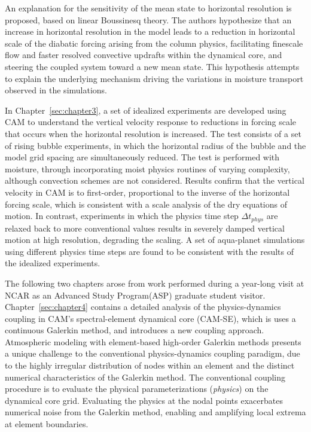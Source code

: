 An explanation for the sensitivity of the mean state to horizontal resolution is proposed, based on linear Boussinesq theory. The authors hypothesize that an increase in horizontal resolution in the model leads to a reduction in horizontal scale of the diabatic forcing arising from the column physics, facilitating finescale flow and faster resolved convective updrafts within the dynamical core, and steering the coupled system toward a new mean state. This hypothesis attempts to explain the underlying mechanism driving the variations in moisture transport observed in the simulations.

In Chapter~\ref{sec:chapter3}, a set of idealized experiments are developed using CAM to understand the vertical velocity response to reductions in forcing scale that occurs when the horizontal resolution is increased. The test consists of a set of rising bubble experiments, in which the horizontal radius of the bubble and the model grid spacing are simultaneously reduced. The test is performed with moisture, through incorporating moist physics routines of varying complexity, although convection schemes are not considered. Results confirm that the vertical velocity in CAM is to first-order, proportional to the inverse of the horizontal forcing scale, which is consistent with a scale analysis of the dry equations of motion. In contrast, experiments in which the physics time step $\Delta t_{phys}$ are relaxed back to more conventional values results in severely damped vertical motion at high resolution, degrading the scaling. A set of aqua-planet simulations using different physics time steps are found to be consistent with the results of the idealized experiments.

The following two chapters arose from work performed during a year-long visit at NCAR as an Advanced Study Program(ASP) graduate student visitor. Chapter~\ref{sec:chapter4} contains a detailed analysis of the physics-dynamics coupling in CAM's spectral-element dynamical core (CAM-SE), which is uses a continuous Galerkin method, and introduces a new coupling approach. Atmospheric modeling with element-based high-order Galerkin methods presents a unique challenge to the conventional physics-dynamics coupling paradigm, due to the highly irregular distribution of nodes within an element and the distinct numerical characteristics of the Galerkin method. The conventional coupling procedure is to evaluate the physical parameterizations ({\em{physics}}) on the dynamical core grid. Evaluating the physics at the nodal points exacerbates numerical noise from the Galerkin method, enabling and amplifying local extrema at element boundaries. 

